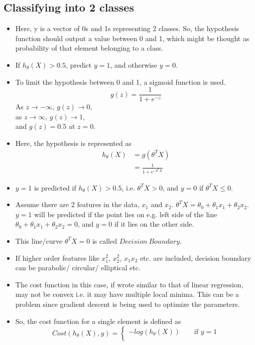 \documentclass{article}
\begin{document}
\subsection{Classifying into 2 classes}
\begin{itemize}
	\item Here, y is a vector of 0s and 1s representing 2 classes. So, the hypothesis function should output a value between 0 and 1, which might be thought as probability of that element belonging to a class.
	\item If $h_\theta(X) > 0.5$, predict $y=1$, and otherwise $y=0$.
	\item To limit the hypothesis between 0 and 1, a sigmoid function is used. $$g(z) = \frac{1}{1+e^{-z}}$$
	As $z\rightarrow -\infty$, $g(z)\rightarrow 0$,\\
	as $z\rightarrow \infty$, $g(z)\rightarrow 1$,\\
	and $g(z)=0.5$ at $z=0$.
	\item Here, the hypothesis is represented as \begin{align*}
		h_\theta(X) &= g(\theta ^T X)\\
					&= \frac{1}{1+e^{-\theta ^T X}}
	\end{align*}
	\item $y=1$ is predicted if $h_\theta(X)>0.5$, i.e. $\theta^T X >0$, and $y=0$ if $\theta^T X \le 0$.
	\item Assume there are 2 features in the data, $x_1$ and $x_2$. $\theta^T X = \theta_0 + \theta_1x_1 + \theta_2x_2$. $y=1$ will be predicted if the point lies on e.g. left side of the line $\theta_0 + \theta_1x_1 + \theta_2x_2=0$, and $y=0$ if it lies on the other side.
	\item This line/curve $\theta^T X = 0$ is called $Decision\ Boundary$.
	\item If higher order features like $x_1^2$, $x_2^2$, $x_1x_2$ etc. are included, decision boundary can be parabolic/ circular/ elliptical etc.
	\item The cost function in this case, if wrote similar to that of linear regression, may not be convex i.e. it may have multiple local minima. This can be a problem since gradient descent is being used to optimize the parameters.
	\item So, the cost function for a single element is defined as \begin{equation*}
		Cost(h_\theta(X),y) = \left\{ \begin{array}{l}
			-log(h_\theta(X)) \ \ \ \ \ \ \ \ \ \text{if $y=1$}\\

\end{array}
\end{equation*}
\end{itemize}
\end{document}
